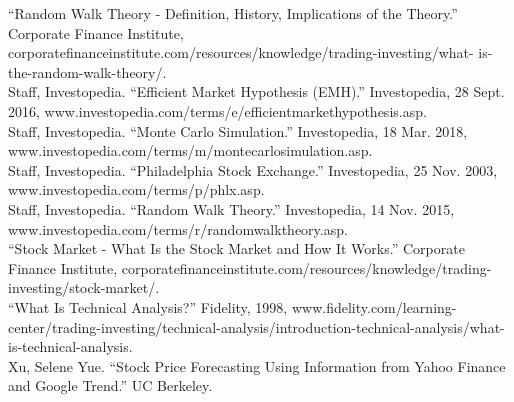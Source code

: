 \documentclass{article}
\begin{document}
“Random Walk Theory - Definition, History, Implications of the Theory.”  Corporate Finance Institute, corporatefinanceinstitute.com/resources/knowledge/trading-investing/what- is-the-random-walk-theory/.
\\
Staff, Investopedia. “Efficient Market Hypothesis (EMH).” Investopedia, 28 Sept. 2016, www.investopedia.com/terms/e/efficientmarkethypothesis.asp.
\\
Staff, Investopedia. “Monte Carlo Simulation.” Investopedia, 18 Mar. 2018, www.investopedia.com/terms/m/montecarlosimulation.asp.
\\
Staff, Investopedia. “Philadelphia Stock Exchange.” Investopedia, 25 Nov. 2003, www.investopedia.com/terms/p/phlx.asp.
\\
Staff, Investopedia. “Random Walk Theory.” Investopedia, 14 Nov. 2015, www.investopedia.com/terms/r/randomwalktheory.asp.
\\
“Stock Market - What Is the Stock Market and How It Works.” Corporate Finance Institute, corporatefinanceinstitute.com/resources/knowledge/trading-investing/stock-market/.
\\
“What Is Technical Analysis?” Fidelity, 1998, www.fidelity.com/learning-center/trading-investing/technical-analysis/introduction-technical-analysis/what-is-technical-analysis.
\\
Xu, Selene Yue. “Stock Price Forecasting Using Information from Yahoo Finance and Google Trend.” UC Berkeley.

\newpage
\end{document}

